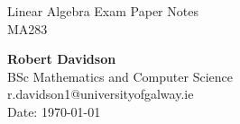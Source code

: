\documentclass[a4paper, 10pt]{article}
\begin{document}
\begin{center}

    Linear Algebra Exam Paper Notes\\
    MA283\\[24pt]
    \LARGE

    \Large
    \textbf{Robert Davidson}\\[6pt]
    \small
    BSc Mathematics and Computer Science \\ r.davidson1@universityofgalway.ie\\[6pt]
    Date: \today\\[12pt]
\end{center}

\renewcommand{\abstractname}{Exam Outlines}
\begin{abstract}
    \begin{adjustwidth}{1cm}{1cm}
        \textbf{Fomrulae and Log Tables:} : Allowed \\
        \textbf{Instructions:}  Answer 3 questions out of 4.
    \end{adjustwidth}
\end{abstract}

\vspace{1.5cm}
\end{document}
